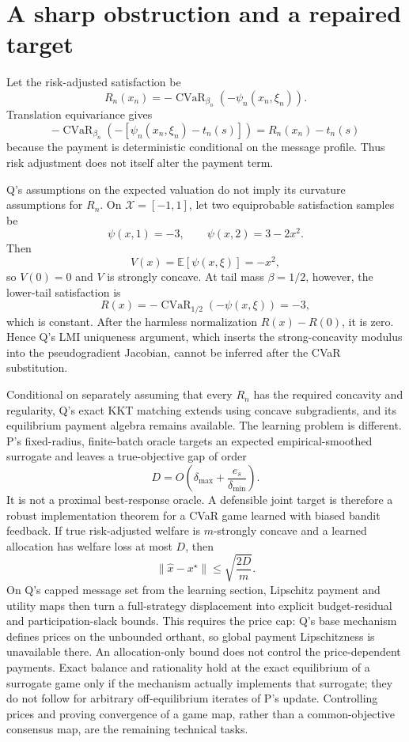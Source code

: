 \section*{A sharp obstruction and a repaired target}

Let the risk-adjusted satisfaction be
\[
R_n(x_n)=-\operatorname{CVaR}_{\beta_n}(-\psi_n(x_n,\xi_n)).
\]
Translation equivariance gives
\[
-\operatorname{CVaR}_{\beta_n}(-[\psi_n(x_n,\xi_n)-t_n(s)])
=R_n(x_n)-t_n(s)
\]
because the payment is deterministic conditional on the message profile. Thus risk
adjustment does not itself alter the payment term.

Q's assumptions on the expected valuation do not imply its curvature assumptions
for \(R_n\). On \(\mathcal X=[-1,1]\), let two equiprobable satisfaction samples be
\[
\psi(x,1)=-3,\qquad \psi(x,2)=3-2x^2.
\]
Then
\[
V(x)=\mathbb E[\psi(x,\xi)]=-x^2,
\]
so \(V(0)=0\) and \(V\) is strongly concave. At tail mass
\(\beta=1/2\), however, the lower-tail satisfaction is
\[
R(x)=-\operatorname{CVaR}_{1/2}(-\psi(x,\xi))=-3,
\]
which is constant. After the harmless normalization \(R(x)-R(0)\), it is zero.
Hence Q's LMI uniqueness argument, which inserts the strong-concavity modulus into
the pseudogradient Jacobian, cannot be inferred after the CVaR substitution.

Conditional on separately assuming that every \(R_n\) has the required concavity
and regularity, Q's exact KKT matching extends using concave subgradients, and its
equilibrium payment algebra remains available. The learning problem is different.
P's fixed-radius, finite-batch oracle targets an expected empirical-smoothed
surrogate and leaves a true-objective gap of order
\[
D=O\left(\delta_{\max}+\frac{e_s}{\delta_{\min}}\right).
\]
It is not a proximal best-response oracle. A defensible joint target is therefore
a robust implementation theorem for a CVaR game learned with biased bandit
feedback. If true risk-adjusted welfare is \(m\)-strongly concave and a learned
allocation has welfare loss at most \(D\), then
\[
\|\widehat x-x^\star\|\leq\sqrt{\frac{2D}{m}}.
\]
On Q's capped message set from the learning section, Lipschitz payment and utility
maps then turn a full-strategy displacement into explicit budget-residual and
participation-slack bounds. This requires the price cap: Q's base mechanism defines
prices on the unbounded orthant, so global payment Lipschitzness is unavailable there.
An allocation-only bound does not control the price-dependent payments. Exact balance
and rationality hold at the exact equilibrium of a surrogate
game only if the mechanism actually implements that surrogate; they do not follow
for arbitrary off-equilibrium iterates of P's update. Controlling prices and proving
convergence of a game map, rather than a common-objective consensus map, are the
remaining technical tasks.
